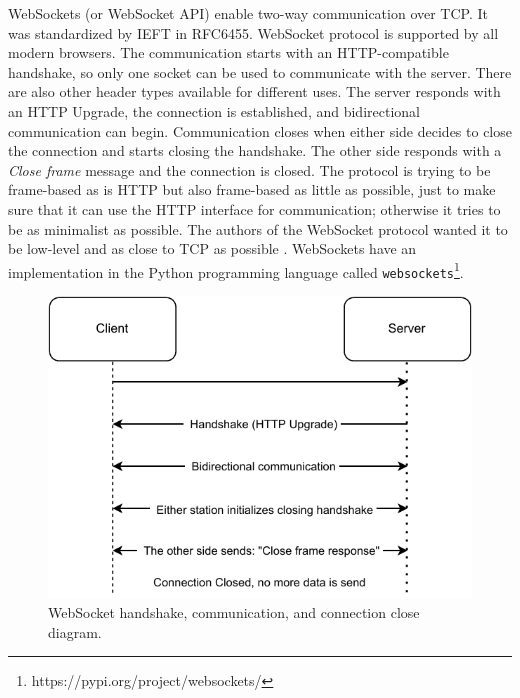 WebSockets (or WebSocket API) enable two-way communication over TCP. It was standardized by IEFT in RFC6455. WebSocket protocol is supported by all modern browsers. The communication starts with an HTTP-compatible handshake, so only one socket can be used to communicate with the server. There are also other header types available for different uses. The server responds with an HTTP Upgrade, the connection is established, and bidirectional communication can begin. Communication closes when either side decides to close the connection and starts closing the handshake. The other side responds with a \textit{Close frame} message and the connection is closed. The protocol is trying to be frame-based as is HTTP but also frame-based as little as possible, just to make sure that it can use the HTTP interface for communication; otherwise it tries to be as minimalist as possible. The authors of the WebSocket protocol wanted it to be low-level and as close to TCP as possible \cite{websock}. WebSockets have an implementation in the Python programming language called \verb|websockets|\footnote{https://pypi.org/project/websockets/}.

\begin{figure}[h]
    \centering
    \includegraphics{pdf/websocket.drawio.pdf}
    \caption{WebSocket handshake, communication, and connection close diagram.}
    \label{fig:websocket}
\end{figure}


